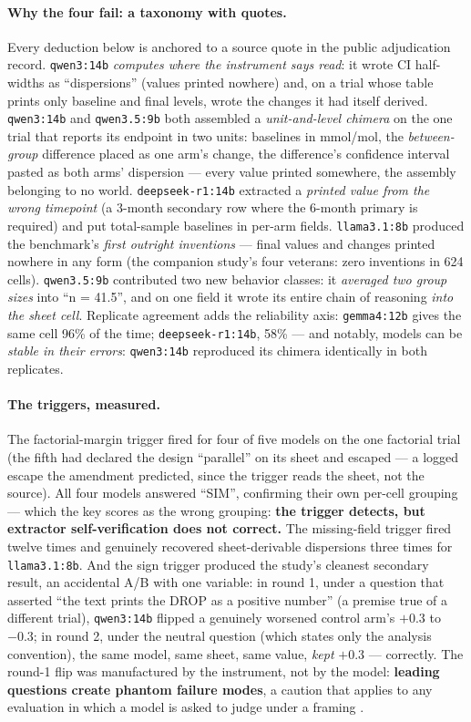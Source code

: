 \documentclass[11pt]{article}
\begin{document}
\paragraph{Why the four fail: a taxonomy with quotes.} Every deduction below is anchored to a source quote in the public adjudication record. \texttt{qwen3:14b} \emph{computes where the instrument says read}: it wrote CI half-widths as ``dispersions'' (values printed nowhere) and, on a trial whose table prints only baseline and final levels, wrote the changes it had itself derived. \texttt{qwen3:14b} and \texttt{qwen3.5:9b} both assembled a \emph{unit-and-level chimera} on the one trial that reports its endpoint in two units: baselines in mmol/mol, the \emph{between-group} difference placed as one arm's change, the difference's confidence interval pasted as both arms' dispersion --- every value printed somewhere, the assembly belonging to no world. \texttt{deepseek-r1:14b} extracted a \emph{printed value from the wrong timepoint} (a 3-month secondary row where the 6-month primary is required) and put total-sample baselines in per-arm fields. \texttt{llama3.1:8b} produced the benchmark's \emph{first outright inventions} --- final values and changes printed nowhere in any form (the companion study's four veterans: zero inventions in 624 cells). \texttt{qwen3.5:9b} contributed two new behavior classes: it \emph{averaged two group sizes} into ``n = 41.5'', and on one field it wrote its entire chain of reasoning \emph{into the sheet cell}. Replicate agreement adds the reliability axis: \texttt{gemma4:12b} gives the same cell 96\% of the time; \texttt{deepseek-r1:14b}, 58\% --- and notably, models can be \emph{stable in their errors}: \texttt{qwen3:14b} reproduced its chimera identically in both replicates.

\paragraph{The triggers, measured.}\label{sec:ab} The factorial-margin trigger fired for four of five models on the one factorial trial (the fifth had declared the design ``parallel'' on its sheet and escaped --- a logged escape the amendment predicted, since the trigger reads the sheet, not the source). All four models answered ``SIM'', confirming their own per-cell grouping --- which the key scores as the wrong grouping: \textbf{the trigger detects, but extractor self-verification does not correct.} The missing-field trigger fired twelve times and genuinely recovered sheet-derivable dispersions three times for \texttt{llama3.1:8b}. And the sign trigger produced the study's cleanest secondary result, an accidental A/B with one variable: in round 1, under a question that asserted ``the text prints the DROP as a positive number'' (a premise true of a different trial), \texttt{qwen3:14b} flipped a genuinely worsened control arm's $+0.3$ to $-0.3$; in round 2, under the neutral question (which states only the analysis convention), the same model, same sheet, same value, \emph{kept} $+0.3$ --- correctly. The round-1 flip was manufactured by the instrument, not by the model: \textbf{leading questions create phantom failure modes}, a caution that applies to any evaluation in which a model is asked to judge under a framing \citep{zheng2023judging}.
\end{document}
